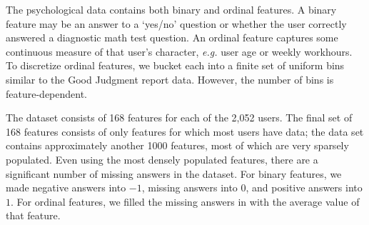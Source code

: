 \documentclass{article}
\begin{document}
The psychological data contains both binary and ordinal features. A binary feature may be an answer to a `yes/no' question or whether the user correctly answered a diagnostic math test question. An ordinal feature captures some continuous measure of that user's character, \textit{e.g.} user age or weekly workhours. To discretize ordinal features, we bucket each into a finite set of uniform bins similar to the Good Judgment report data. However, the number of bins is feature-dependent. 

The dataset consists of 168 features for each of the 2,052 users. The final set of 168 features consists of only features for which most users have data; the data set contains approximately another 1000 features, most of which are very sparsely populated. Even using the most densely populated features, there are a significant number of missing answers in the dataset. For binary features, we made negative answers into $-1$, missing answers into $0$, and positive answers into $1$. For ordinal features, we filled the missing answers in with the average value of that feature. 
\end{document}
